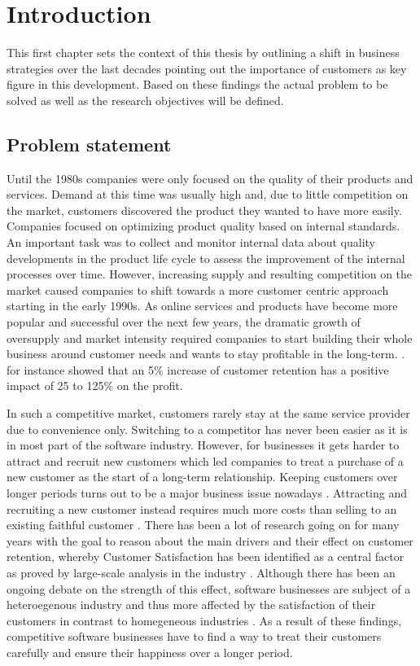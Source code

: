 \chapter{Introduction}
\label{ch:intro}
This first chapter sets the context of this thesis by outlining a shift in business strategies over the last decades pointing out the importance of customers as key figure in this development. Based on these findings the actual problem to be solved as well as the research objectives will be defined. 

\section{Problem statement}
\label{sec:problem}
Until the 1980s companies were only focused on the quality of their products and services. Demand at this time was usually high and, due to little competition on the market, customers discovered the product they wanted to have more easily. Companies focused on optimizing product quality based on internal standards. An important task was to collect and monitor internal data about quality developments in the product life cycle to assess the improvement of the internal processes over time. However, increasing supply and resulting competition on the market caused companies to shift towards a more customer centric approach starting in the early 1990s. As online services and products have become more popular and successful over the next few years, the dramatic growth of oversupply and market intensity required companies to start building their whole business around customer needs and wants to stay profitable in the long-term. \cite{neckel2015}. \cite{bowen2001relationship} for instance showed that an 5\% increase of customer retention has a positive impact of 25 to 125\% on the profit.

In such a competitive market, customers rarely stay at the same service provider due to convenience only. Switching to a competitor has never been easier \cite{rygielski2002data} as it is in most part of the software industry. However, for businesses it gets harder to attract and recruit new customers which led companies to treat a purchase of a new customer as the start of a long-term relationship. Keeping customers over longer periods turns out to be a major business issue nowadays \cite{nerdinger2015} \cite{neckel2015}. Attracting and recruiting a new customer instead requires much more costs than selling to an existing faithful customer \cite{aydin2006switching}. There has been a lot of research going on for many years with the goal to reason about the main drivers and their effect on customer retention, whereby Customer Satisfaction has been identified as a central factor as proved by large-scale analysis in the industry \cite{fornell1992national} \cite{bolton1998dynamic} \cite{gustafsson2005effects}. Although there has been an ongoing debate on the strength of this effect, software businesses are subject of a heteroegenous industry and thus more affected by the satisfaction of their customers in contrast to homegeneous industries \cite{fornell1992national}. As a result of these findings, competitive software businesses have to find a way to treat their customers carefully and ensure their happiness over a longer period. 

